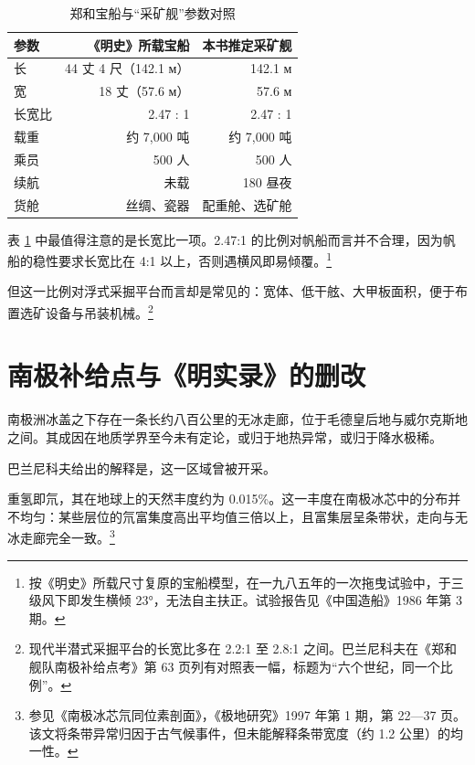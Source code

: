 \begin{table}[htbp]
\centering
\caption{郑和宝船与“采矿舰”参数对照}
\label{tab:ship}
\footnotesize
\begin{tabular}{@{}lrr@{}}
\toprule
\textbf{参数} & \textbf{《明史》所载宝船} & \textbf{本书推定采矿舰}\\
\midrule
长 & 44 丈 4 尺（142.1 м） & 142.1 м\\
宽 & 18 丈（57.6 м） & 57.6 м\\
长宽比 & 2.47 : 1 & 2.47 : 1\\
载重 & 约 7{,}000 吨 & 约 7{,}000 吨\\
乘员 & 500 人 & 500 人\\
续航 & 未载 & 180 昼夜\\
货舱 & 丝绸、瓷器 & 配重舱、选矿舱\\
\bottomrule
\end{tabular}
\end{table}

表 \ref{tab:ship} 中最值得注意的是长宽比一项。2.47:1 的比例对帆船而言并不合理，因为帆船的稳性要求长宽比在 4:1 以上，否则遇横风即易倾覆。\footnote{按《明史》所载尺寸复原的宝船模型，在一九八五年的一次拖曳试验中，于三级风下即发生横倾 23°，无法自主扶正。试验报告见《中国造船》1986 年第 3 期。}

但这一比例对浮式采掘平台而言却是常见的：宽体、低干舷、大甲板面积，便于布置选矿设备与吊装机械。\footnote{现代半潜式采掘平台的长宽比多在 2.2:1 至 2.8:1 之间。巴兰尼科夫在《郑和舰队南极补给点考》第 63 页列有对照表一幅，标题为“六个世纪，同一个比例”。}

\section{南极补给点与《明实录》的删改}

南极洲冰盖之下存在一条长约八百公里的无冰走廊，位于毛德皇后地与威尔克斯地之间。其成因在地质学界至今未有定论，或归于地热异常，或归于降水极稀。

巴兰尼科夫给出的解释是，这一区域曾被开采。

重氢即氘，其在地球上的天然丰度约为 0.015\%。这一丰度在南极冰芯中的分布并不均匀：某些层位的氘富集度高出平均值三倍以上，且富集层呈条带状，走向与无冰走廊完全一致。\footnote{参见《南极冰芯氘同位素剖面》，《极地研究》1997 年第 1 期，第 22—37 页。该文将条带异常归因于古气候事件，但未能解释条带宽度（约 1.2 公里）的均一性。}

